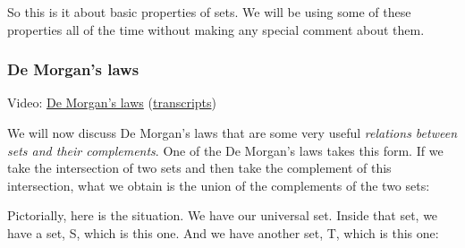 \documentclass[pdftex, brazil, 12pt, twoside]{article}
\begin{document}
So this is it about basic properties of sets.
We will be using some of these properties all of the time
without making any special comment about them.

\subsubsection{De Morgan's laws}
\label{un1-math-morgan-laws}

Video: \href{https://www.youtube.com/watch?v=pklIkeuveOE}{De Morgan's laws}
(\href{Unit-1/02\_mathematical\_background/mb\_3\_transcripts.pdf}{transcripts})

\begin{figure}[H]
  \begin{center}
  \end{center}
\end{figure}

We will now discuss De Morgan's laws that are some
very useful \emph{relations between sets and their complements}.
One of the De Morgan's laws takes this form.
If we take the intersection of two sets and then take the
complement of this intersection, what we obtain
is the union of the complements of the two sets:

\begin{figure}[H]
  \begin{center}
  \end{center}
\end{figure}

Pictorially, here is the situation.
We have our universal set.
Inside that set, we have a set, S, which is this one.
And we have another set, T, which is this one:

\begin{figure}[H]
  \begin{center}
  \end{center}
\end{figure}
\end{document}
